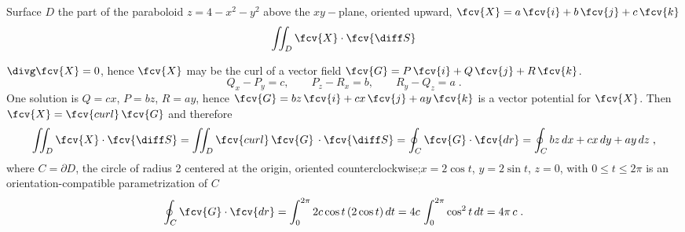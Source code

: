 \begin{frame}

Surface $D$ the part of the paraboloid $z=4-x^2-y^2$ above the $xy-$plane, oriented upward, $\fcv{X} = a\, \fcv{i} +b\, \fcv{j} +c\, \fcv{k}$
%
$$\iint_D \fcv{X} \cdot \fcv{\diff S} $$
%

\pause
$\divg \fcv{X} =0$, hence $\fcv{X}$ may be the curl of a vector field $\fcv{G}=P\, \fcv{i} + Q\, \fcv{j} + R\, \fcv{k}$.\pause
%
$$Q_x - P_y = c, \qquad P_z-R_x = b, \qquad R_y-Q_z= a\; .$$
%
\pause One solution is $Q=cx$, $P=bz$, $R=ay$, hence $\fcv{G} = bz\, \fcv{i} + cx\, \fcv{j} + ay\, \fcv{k}$ is a vector potential for $\fcv{X}$. Then $\fcv{X}= \fcv{curl}\, \fcv{G}$ and therefore
%
$$\iint_D \fcv{X} \cdot \fcv{\diff S} = \iint_D \fcv{curl}\, \fcv{G}\, \cdot \fcv{\diff S} = \oint_C \fcv{G} \cdot \fcv{dr} = \oint_C bz\, dx + cx\, dy + ay\, dz\; ,$$
%
where $C =\partial D$, the circle of radius 2 centered at the origin, oriented counterclockwise;\pause $x=2\cos{t}$, $y=2\sin{t}$, $z=0$, with $0 \leqslant t \leqslant 2\pi$ is an orientation-compatible parametrization of $C$
%
$$\oint_{C} \fcv{G} \cdot \fcv{dr} = \int_{0}^{2\pi} 2c\cos{t} \, (2\cos{t}) \, dt = 4c\, \int_{0}^{2\pi} \cos^2{t} \, dt = 4\pi\,c \; .$$
\end{frame}